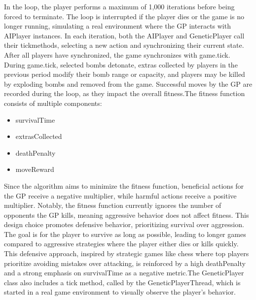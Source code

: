 \documentclass[sigconf]{acmart} %
\begin{document}
In the loop, the player performs a maximum of 1,000 iterations before being forced to terminate. The loop is interrupted if the player dies or the game is no longer running, simulating a real environment where the GP interacts with AIPlayer instances. In each iteration, both the AIPlayer and GeneticPlayer call their tickmethods, selecting a new action and synchronizing their current state. After all players have synchronized, the game synchronizes with game.tick. During game.tick, selected bombs detonate, extras collected by players in the previous period modify their bomb range or capacity, and players may be killed by exploding bombs and removed from the game. Successful moves by the GP are recorded during the loop, as they impact the overall fitness.The fitness function consists of multiple components: 
\begin{itemize}
      \item survivalTime 
      \item extrasCollected 
      \item deathPenalty 
      \item moveReward 
\end{itemize}
Since the algorithm aims to minimize the fitness function, beneficial actions for the GP receive a negative multiplier, while harmful actions receive a positive multiplier. Notably, the fitness function currently ignores the number of opponents the GP kills, meaning aggressive behavior does not affect fitness. This design choice promotes defensive behavior, prioritizing survival over aggression. The goal is for the player to survive as long as possible, leading to longer games compared to aggressive strategies where the player either dies or kills quickly. This defensive approach, inspired by strategic games like chess where top players prioritize avoiding mistakes over attacking, is reinforced by a high deathPenalty and a strong emphasis on survivalTime as a negative metric.The GeneticPlayer class also includes a tick method, called by the GeneticPlayerThread, which is started in a real game environment to visually observe the player's behavior. 
\end{document}
